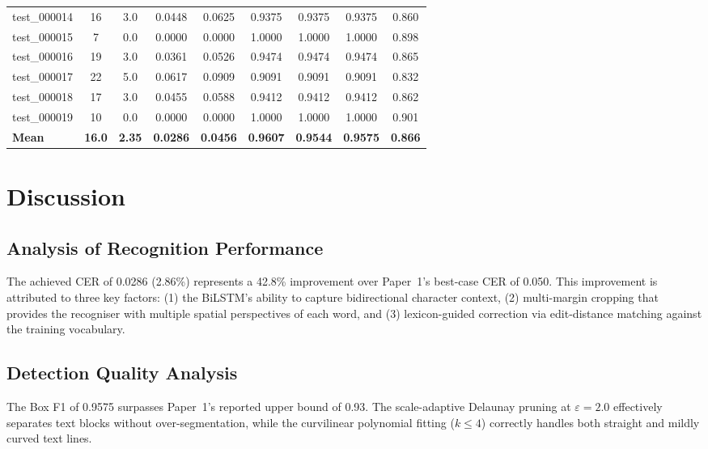\documentclass[conference]{IEEEtran}
\begin{document}
\begin{table}[t]
{\begin{tabular}{lcccccccc}
        test\_000014 & 16 & 3.0 & 0.0448 & 0.0625 & 0.9375 & 0.9375 & 0.9375 & 0.860 \\
        test\_000015 & 7  & 0.0 & 0.0000 & 0.0000 & 1.0000 & 1.0000 & 1.0000 & 0.898 \\
        test\_000016 & 19 & 3.0 & 0.0361 & 0.0526 & 0.9474 & 0.9474 & 0.9474 & 0.865 \\
        test\_000017 & 22 & 5.0 & 0.0617 & 0.0909 & 0.9091 & 0.9091 & 0.9091 & 0.832 \\
        test\_000018 & 17 & 3.0 & 0.0455 & 0.0588 & 0.9412 & 0.9412 & 0.9412 & 0.862 \\
        test\_000019 & 10 & 0.0 & 0.0000 & 0.0000 & 1.0000 & 1.0000 & 1.0000 & 0.901 \\
        \midrule
        \textbf{Mean} & \textbf{16.0} & \textbf{2.35} & \textbf{0.0286} & \textbf{0.0456} & \textbf{0.9607} & \textbf{0.9544} & \textbf{0.9575} & \textbf{0.866} \\
        \bottomrule
    \end{tabular}%
    }
\end{table}

\section{Discussion}

\subsection{Analysis of Recognition Performance}
The achieved CER of 0.0286 (2.86\%) represents a 42.8\% improvement over Paper~1's best-case CER of 0.050. This improvement is attributed to three key factors: (1) the BiLSTM's ability to capture bidirectional character context, (2) multi-margin cropping that provides the recogniser with multiple spatial perspectives of each word, and (3) lexicon-guided correction via edit-distance matching against the training vocabulary.

\subsection{Detection Quality Analysis}
The Box F1 of 0.9575 surpasses Paper~1's reported upper bound of 0.93. The scale-adaptive Delaunay pruning at $\varepsilon = 2.0$ effectively separates text blocks without over-segmentation, while the curvilinear polynomial fitting ($k \leq 4$) correctly handles both straight and mildly curved text lines.
\end{document}
